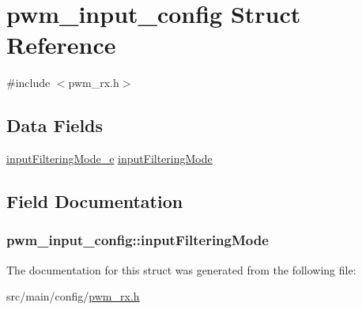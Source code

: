 \hypertarget{structpwm__input__config}{\section{pwm\+\_\+input\+\_\+config Struct Reference}
\label{structpwm__input__config}
}


{\ttfamily \#include $<$pwm\+\_\+rx.\+h$>$}

\subsection*{Data Fields}
\begin{DoxyCompactItemize}
\item 
\hyperlink{config_2pwm__rx_8h_aea6907a11ec3d80d678511f3db8fcf08}{input\+Filtering\+Mode\+\_\+e} \hyperlink{structpwm__input__config_aadf521d2454330098fb09120dcc89fcf}{input\+Filtering\+Mode}
\end{DoxyCompactItemize}


\subsection{Field Documentation}
\hypertarget{structpwm__input__config_aadf521d2454330098fb09120dcc89fcf}{
\subsubsection[{input\+Filtering\+Mode}]{ pwm\+\_\+input\+\_\+config\+::input\+Filtering\+Mode}}\label{structpwm__input__config_aadf521d2454330098fb09120dcc89fcf}


The documentation for this struct was generated from the following file\+:\begin{DoxyCompactItemize}
\item 
src/main/config/\hyperlink{config_2pwm__rx_8h}{pwm\+\_\+rx.\+h}\end{DoxyCompactItemize}
